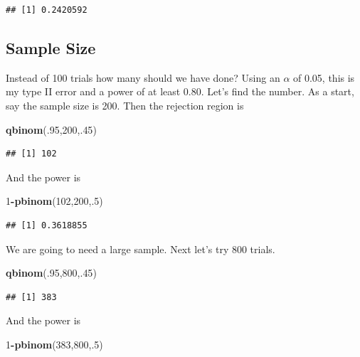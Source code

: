 \documentclass[]{book}
\newenvironment{Shaded}{\begin{snugshade}}{\end{snugshade}}
\newcommand{\KeywordTok}[1]{\textcolor[rgb]{0.13,0.29,0.53}{\textbf{#1}}}
\newcommand{\DecValTok}[1]{\textcolor[rgb]{0.00,0.00,0.81}{#1}}
\newcommand{\OperatorTok}[1]{\textcolor[rgb]{0.81,0.36,0.00}{\textbf{#1}}}
\newcommand{\NormalTok}[1]{#1}
\theoremstyle{definition}
\theoremstyle{definition}
\theoremstyle{definition}
\theoremstyle{remark}
\begin{document}
\begin{verbatim}
## [1] 0.2420592
\end{verbatim}

\subsection{Sample Size}\label{sample-size}

Instead of 100 trials how many should we have done? Using an \(\alpha\)
of 0.05, this is my type II error and a power of at least 0.80. Let's
find the number. As a start, say the sample size is 200. Then the
rejection region is

\begin{Shaded}
\begin{Highlighting}[]
\KeywordTok{qbinom}\NormalTok{(.}\DecValTok{95}\NormalTok{,}\DecValTok{200}\NormalTok{,.}\DecValTok{45}\NormalTok{)}
\end{Highlighting}
\end{Shaded}

\begin{verbatim}
## [1] 102
\end{verbatim}

And the power is

\begin{Shaded}
\begin{Highlighting}[]
\DecValTok{1}\OperatorTok{-}\KeywordTok{pbinom}\NormalTok{(}\DecValTok{102}\NormalTok{,}\DecValTok{200}\NormalTok{,.}\DecValTok{5}\NormalTok{)}
\end{Highlighting}
\end{Shaded}

\begin{verbatim}
## [1] 0.3618855
\end{verbatim}

We are going to need a large sample. Next let's try 800 trials.

\begin{Shaded}
\begin{Highlighting}[]
\KeywordTok{qbinom}\NormalTok{(.}\DecValTok{95}\NormalTok{,}\DecValTok{800}\NormalTok{,.}\DecValTok{45}\NormalTok{)}
\end{Highlighting}
\end{Shaded}

\begin{verbatim}
## [1] 383
\end{verbatim}

And the power is

\begin{Shaded}
\begin{Highlighting}[]
\DecValTok{1}\OperatorTok{-}\KeywordTok{pbinom}\NormalTok{(}\DecValTok{383}\NormalTok{,}\DecValTok{800}\NormalTok{,.}\DecValTok{5}\NormalTok{)}
\end{Highlighting}
\end{Shaded}
\end{document}
